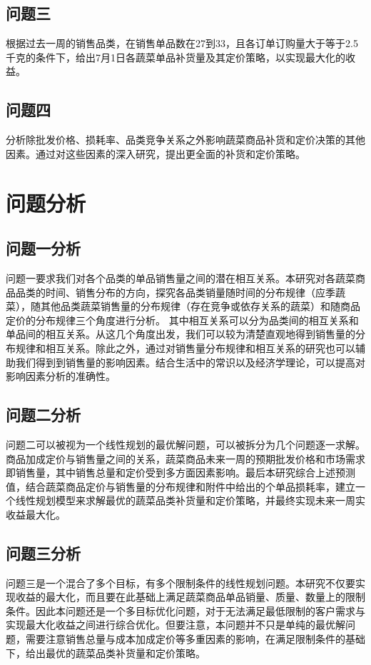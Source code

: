 \documentclass{article}
\begin{document}
\subsection{问题三}

根据过去一周的销售品类，在销售单品数在27到33，且各订单订购量大于等于2.5千克的条件下，给出7月1日各蔬菜单品补货量及其定价策略，以实现最大化的收益。
\subsection{问题四}

分析除批发价格、损耗率、品类竞争关系之外影响蔬菜商品补货和定价决策的其他因素。通过对这些因素的深入研究，提出更全面的补货和定价策略。
\section{问题分析}

\subsection{问题一分析}
问题一要求我们对各个品类的单品销售量之间的潜在相互关系。本研究对各蔬菜商品品类的时间、销售分布的方向，探究各品类销量随时间的分布规律（应季蔬菜），随其他品类蔬菜销售量的分布规律（存在竞争或依存关系的蔬菜）和随商品定价的分布规律三个角度进行分析。
其中相互关系可以分为品类间的相互关系和单品间的相互关系。从这几个角度出发，我们可以较为清楚直观地得到销售量的分布规律和相互关系。除此之外，通过对销售量分布规律和相互关系的研究也可以辅助我们得到到销售量的影响因素。结合生活中的常识以及经济学理论，可以提高对影响因素分析的准确性。

\subsection{问题二分析}
问题二可以被视为一个线性规划的最优解问题，可以被拆分为几个问题逐一求解。商品加成定价与销售量之间的关系，蔬菜商品未来一周的预期批发价格和市场需求即销售量，其中销售总量和定价受到多方面因素影响。最后本研究综合上述预测值，结合蔬菜商品定价与销售量的分布规律和附件中给出的个单品损耗率，建立一个线性规划模型来求解最优的蔬菜品类补货量和定价策略，并最终实现未来一周实收益最大化。

\subsection{问题三分析}
问题三是一个混合了多个目标，有多个限制条件的线性规划问题。本研究不仅要实现收益的最大化，而且要在此基础上满足蔬菜商品单品销量、质量、数量上的限制条件。因此本问题还是一个多目标优化问题，对于无法满足最低限制的客户需求与实现最大化收益之间进行综合优化。但要注意，本问题并不只是单纯的最优解问题，需要注意销售总量与成本加成定价等多重因素的影响，在满足限制条件的基础下，给出最优的蔬菜品类补货量和定价策略。
\end{document}
